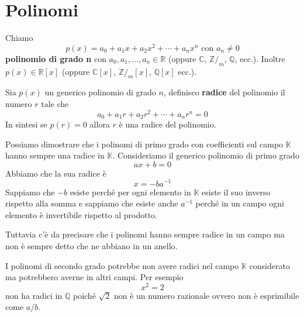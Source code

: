 \section{Polinomi}

\begin{defn}
	Chiamo
	\begin{equation*}
		p(x) = a_0 + a_1x + a_2x^2 + \cdots + a_n x^n \text{ con $a_n \neq 0$}
	\end{equation*}
	\textbf{polinomio di grado n} con $a_0, a_1, \dots, a_n \in \mathbb{R}$
	(oppure $\mathbb{C}$, $\mathbb{Z}/_m$, $\mathbb{Q}$, ecc.). Inoltre $p(x) \in \mathbb{R}[x]$
	(oppure $\mathbb{C}[x]$, $\mathbb{Z}/_m [x]$, $\mathbb{Q}[x]$ ecc.).
\end{defn}

\begin{defn}
	Sia $p(x)$ un generico polinomio di grado $n$, definisco \textbf{radice} del polinomio
	il numero $r$ tale che
	\begin{equation*}
		a_0 + a_1 r + a_2 r^2 + \cdots + a_n r^n = 0
	\end{equation*}
	In sintesi se $p(r) = 0$ allora $r$ \`e una radice del polinomio.
\end{defn}

\begin{observation}
	Possiamo dimostrare che i polinomi di primo grado con coefficienti sul campo $\mathbb{K}$
	hanno sempre una radice in $\mathbb{K}$. Consideriamo il generico polinomio di primo grado
	\begin{equation*}
		ax + b = 0
	\end{equation*}
	Abbiamo che la sua radice \`e
	\begin{equation*}
		x = -b a^{-1}
	\end{equation*}
	Sappiamo che $-b$ esiste perch\'e per ogni elemento in $\mathbb{K}$ esiste il suo inverso
	rispetto alla somma e sappiamo che esiste anche $a^{-1}$ perch\'e in un campo ogni elemento
	\`e invertibile rispetto al prodotto.

	Tuttavia c'\`e da precisare che i polinomi hanno sempre radice in un campo ma non \`e
	sempre detto che ne abbiano in un anello.
\end{observation}

\begin{observation}
	I polinomi di secondo grado potrebbe non avere radici nel campo $\mathbb{K}$ considerato
	ma potrebbero averne in altri campi.
	Per esempio
	\begin{equation*}
		x^2 = 2
	\end{equation*}
	non ha radici in $\mathbb{Q}$ poich\'e $\sqrt{2}$ non \`e un numero razionale ovvero non
	\`e esprimibile come $a / b$.
\end{observation}

